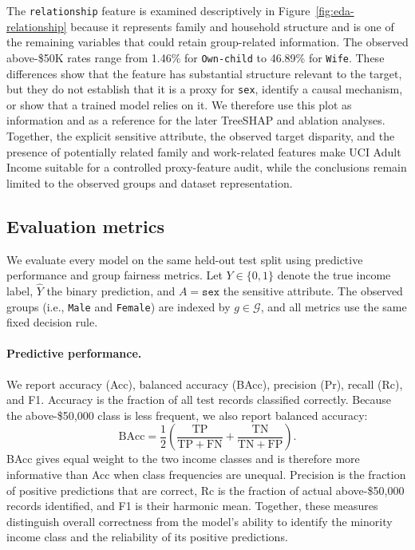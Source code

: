 \documentclass{article}
\begin{document}
The \texttt{relationship} feature is examined descriptively in
Figure~\ref{fig:eda-relationship} because it represents family and household
structure and is one of the remaining variables that could retain
group-related information. The observed above-\$50K rates range from 1.46\%
for \texttt{Own-child} to 46.89\% for \texttt{Wife}. These differences show
that the feature has substantial structure relevant to the target, but they
do not establish that it is a proxy for \texttt{sex}, identify a causal
mechanism, or show that a trained model relies on it. We therefore use this
plot as information and as a reference for the later TreeSHAP and
ablation analyses. Together, the explicit sensitive attribute, the observed
target disparity, and the presence of potentially related family and
work-related features make UCI Adult Income suitable for a controlled proxy-feature
audit, while the conclusions remain limited to the observed groups and
dataset representation.

\subsection{Evaluation metrics}\label{subsec:Metrics}
We evaluate every model on the same held-out test split using predictive
performance and group fairness metrics. Let \(Y\in\{0,1\}\) denote the true
income label, \(\widehat{Y}\) the binary prediction, and
\(A=\texttt{sex}\) the sensitive attribute. The observed groups (i.e., \texttt{Male} and \texttt{Female}) 
are indexed by \(g\in\mathcal{G}\), and all metrics use the same fixed decision rule.

\paragraph{Predictive performance.}
We report accuracy (Acc), balanced accuracy (BAcc), precision (Pr), recall
(Rc), and F1. Accuracy is the fraction of all test records classified
correctly. Because the above-\$50{,}000 class is less frequent, we also report
balanced accuracy:
\[
  \mathrm{BAcc}
  = \frac{1}{2}\left(
    \frac{\mathrm{TP}}{\mathrm{TP}+\mathrm{FN}}
    + \frac{\mathrm{TN}}{\mathrm{TN}+\mathrm{FP}}
  \right).
\]
BAcc gives equal weight to the two income classes and is therefore
more informative than Acc when class frequencies are unequal. Precision is
the fraction of positive predictions that are correct, Rc is the fraction of
actual above-\$50{,}000 records identified, and F1 is their harmonic mean.
Together, these measures distinguish overall correctness from the model's
ability to identify the minority income class and the reliability of its
positive predictions.
\end{document}

